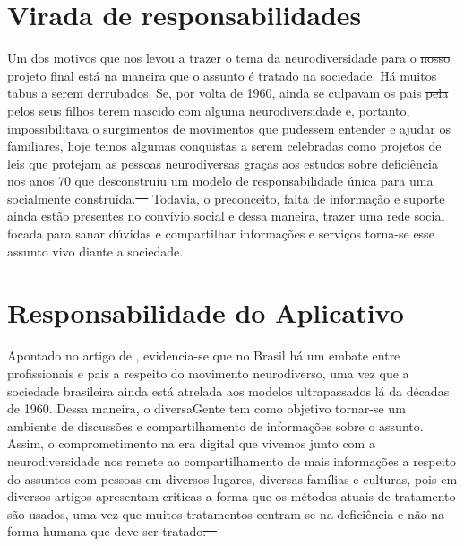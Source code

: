 \documentclass[
    12pt,               %
    openright,          %
    oneside,
    a4paper,            %
    paginasA3,  %
    BIBLATEX,           %
    REFINDENT,          %
    MODELO,             %
    TODO,               %
    english,            %
    brazil              %
    ]{ifsp-spo-inf-ctds} %
\providecommand{\DIFadd}[1]{{\protect\color{blue}\uwave{#1}}} %
\providecommand{\DIFdel}[1]{{\protect\color{red}\sout{#1}}}                      %
\providecommand{\DIFaddbegin}{} %
\providecommand{\DIFaddend}{} %
\providecommand{\DIFdelbegin}{} %
\providecommand{\DIFdelend}{} %
\begin{document}
\section{Virada de responsabilidades}
Um dos motivos que nos levou a trazer o tema da neurodiversidade para o \DIFdelbegin \DIFdel{nosso }\DIFdelend projeto final está na maneira que o assunto é tratado na sociedade. Há muitos tabus a serem derrubados. Se, por volta de 1960, ainda se culpavam os pais \DIFdelbegin \DIFdel{pela }\DIFdelend pelos seus filhos terem nascido com alguma neurodiversidade e, portanto, impossibilitava o surgimentos de movimentos que pudessem entender e ajudar os familiares, hoje temos algumas conquistas a serem celebradas como projetos de leis que protejam as pessoas neurodiversas graças aos estudos sobre deficiência nos anos 70 que desconstruiu um modelo de responsabilidade única para uma socialmente construída.\DIFdelbegin \DIFdel{\mbox{%
\cite{ortega}
}\hspace{0pt}%
}\DIFdelend \DIFaddbegin \DIFadd{\mbox{%
\cite{ortega2008}}\hspace{0pt}%
. }\DIFaddend Todavia, o preconceito, falta de informação e suporte ainda estão presentes no convívio social e dessa maneira, trazer uma rede social focada para sanar dúvidas e compartilhar informações e serviços torna-se esse assunto vivo diante a sociedade.

\section{Responsabilidade do Aplicativo}
Apontado no artigo de \cite{rios}, evidencia-se que no Brasil há um embate entre profissionais e pais a respeito do movimento neurodiverso, uma vez que a sociedade brasileira ainda está atrelada aos modelos ultrapassados lá da décadas de 1960. Dessa maneira, o diversaGente tem como objetivo tornar-se um ambiente de discussões e compartilhamento de informações sobre o assunto. Assim, o comprometimento na era digital que vivemos junto com a neurodiversidade nos remete ao compartilhamento de mais informações a respeito do assuntos com pessoas em diversos lugares, diversas famílias e culturas, pois em diversos artigos apresentam críticas a forma que os métodos atuais de tratamento são usados, uma vez que muitos tratamentos centram-se na deficiência e não na forma humana que deve ser tratado\DIFdelbegin \DIFdel{. \mbox{%
\cite{machado}}\hspace{0pt}%
}\DIFdelend \DIFaddbegin \DIFadd{\mbox{%
\cite{machado}}\hspace{0pt}%
. 
}\DIFaddend 
\end{document}
